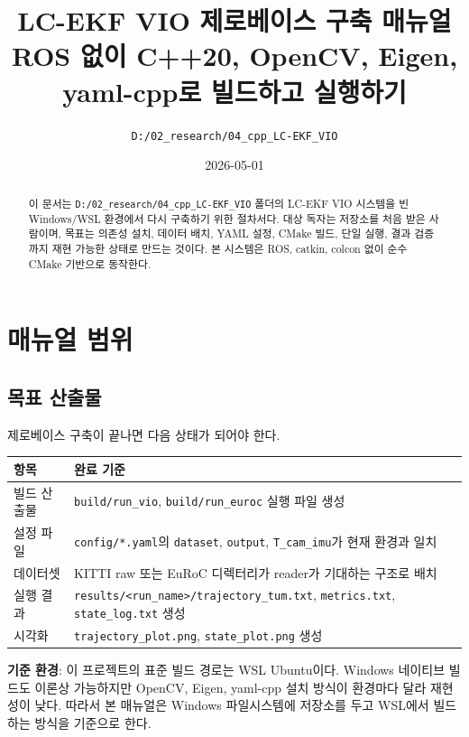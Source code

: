 \documentclass[11pt,a4paper,oneside]{report}
\title{\textbf{LC-EKF VIO 제로베이스 구축 매뉴얼}\\[0.35em]
\large ROS 없이 C++20, OpenCV, Eigen, yaml-cpp로 빌드하고 실행하기}
\author{\texttt{D:/02\_research/04\_cpp\_LC-EKF\_VIO}}
\date{2026-05-01}
\begin{document}
\maketitle

\begin{abstract}
이 문서는 \texttt{D:/02\_research/04\_cpp\_LC-EKF\_VIO} 폴더의 LC-EKF VIO 시스템을
빈 Windows/WSL 환경에서 다시 구축하기 위한 절차서다. 대상 독자는 저장소를 처음 받은
사람이며, 목표는 의존성 설치, 데이터 배치, YAML 설정, CMake 빌드, 단일 실행,
결과 검증까지 재현 가능한 상태로 만드는 것이다. 본 시스템은 ROS, catkin, colcon 없이
순수 CMake 기반으로 동작한다.
\end{abstract}

\tableofcontents
\clearpage

\chapter{매뉴얼 범위}

\section{목표 산출물}

제로베이스 구축이 끝나면 다음 상태가 되어야 한다.

\begin{longtable}{p{}p{}}
\toprule
항목 & 완료 기준 \\
\midrule
빌드 산출물 & \texttt{build/run\_vio}, \texttt{build/run\_euroc} 실행 파일 생성 \\
설정 파일 & \texttt{config/*.yaml}의 \texttt{dataset}, \texttt{output}, \texttt{T\_cam\_imu}가 현재 환경과 일치 \\
데이터셋 & KITTI raw 또는 EuRoC 디렉터리가 reader가 기대하는 구조로 배치 \\
실행 결과 & \texttt{results/<run\_name>/trajectory\_tum.txt}, \texttt{metrics.txt}, \texttt{state\_log.txt} 생성 \\
시각화 & \texttt{trajectory\_plot.png}, \texttt{state\_plot.png} 생성 \\
\bottomrule
\end{longtable}

\begin{infobox}
\textbf{기준 환경}: 이 프로젝트의 표준 빌드 경로는 WSL Ubuntu이다. Windows 네이티브 빌드도
이론상 가능하지만 OpenCV, Eigen, yaml-cpp 설치 방식이 환경마다 달라 재현성이 낮다.
따라서 본 매뉴얼은 Windows 파일시스템에 저장소를 두고 WSL에서 빌드하는 방식을 기준으로 한다.
\end{infobox}
\end{document}
